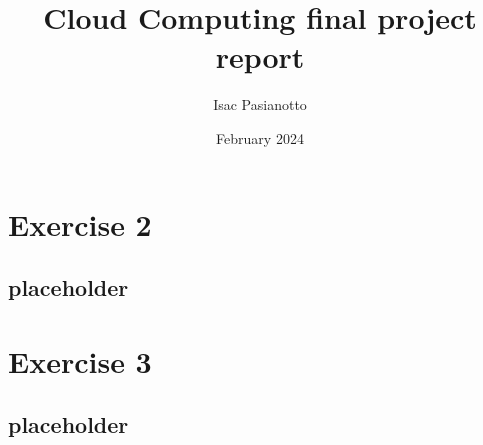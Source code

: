\documentclass[a4paper]{article}
\begin{document}
\title{Cloud Computing final project report}
\author{Isac Pasianotto}
\date{February 2024}
\maketitle
\tableofcontents
\newpage



\section{Exercise 2}

\subsection{placeholder}

\section{Exercise 3}

\subsection{placeholder}
\end{document}
